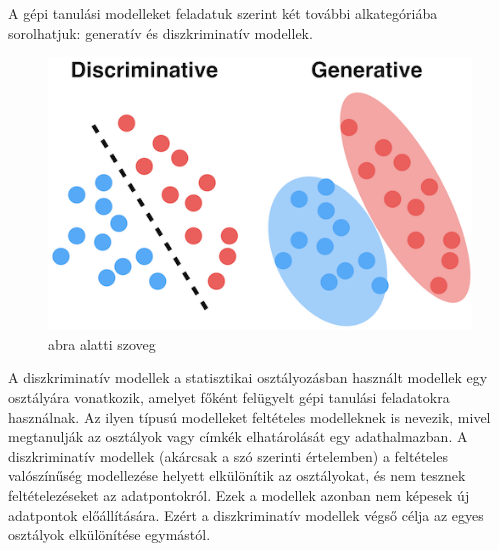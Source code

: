 


A gépi tanulási modelleket feladatuk szerint két további alkategóriába sorolhatjuk: generatív és diszkriminatív modellek. 

\begin{figure}[h]
	\centering
	\includegraphics[width=0.65\columnwidth]{figures/generative_discriminative.png}
	\caption{abra alatti szoveg}
\end{figure}

A diszkriminatív modellek a statisztikai osztályozásban használt modellek egy osztályára vonatkozik, amelyet főként felügyelt gépi tanulási feladatokra használnak. Az ilyen típusú modelleket feltételes modelleknek is nevezik, mivel megtanulják az osztályok vagy címkék elhatárolását egy adathalmazban. A diszkriminatív modellek (akárcsak a szó szerinti értelemben) a feltételes valószínűség modellezése helyett elkülönítik az osztályokat, és nem tesznek feltételezéseket az adatpontokról. Ezek a modellek azonban nem képesek új adatpontok előállítására. Ezért a diszkriminatív modellek végső célja az egyes osztályok elkülönítése egymástól.

